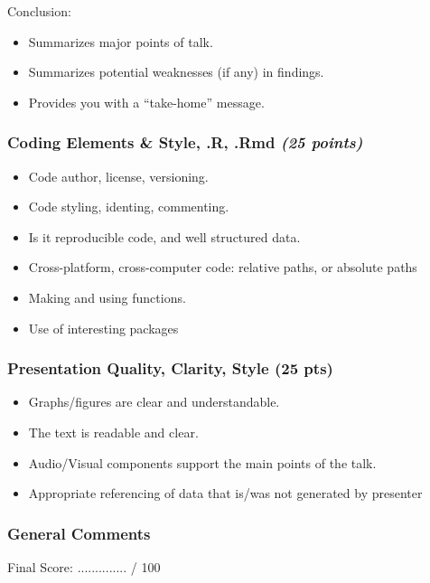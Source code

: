 \documentclass[11pt]{article} %
\begin{document}
      \noindent Conclusion:
        \begin{itemize}  \itemsep0pt
            \item{Summarizes major points of talk.}
            \item{Summarizes potential weaknesses (if any) in findings.}
            \item{Provides you with a “take-home” message.}
        \end{itemize}
      
      \subsubsection{Coding Elements \& Style, .R, .Rmd \emph{(25 points)}}
        \begin{itemize}  \itemsep0pt
            \item{Code author, license, versioning.}
            \item{Code styling, identing, commenting.}
            \item{Is it reproducible code, and well structured data.}
            \item{Cross-platform, cross-computer code: relative paths, or absolute paths}
            \item{Making and using functions.}
            \item{Use of interesting packages}
        \end{itemize}
      
      \subsubsection{Presentation Quality, Clarity, Style (25 pts)}
        \begin{itemize}  \itemsep0pt
            \item{Graphs/figures are clear and understandable.}
            \item{The text is readable and clear.}
            \item{Audio/Visual components support the main points of the talk.}
            \item{Appropriate referencing of data that is/was not generated by presenter}
        \end{itemize}
      
      \subsubsection{General  Comments}
        \begin{flushright}
         Final Score:  ..............  / 100
        \end{flushright}
        
\end{document}
